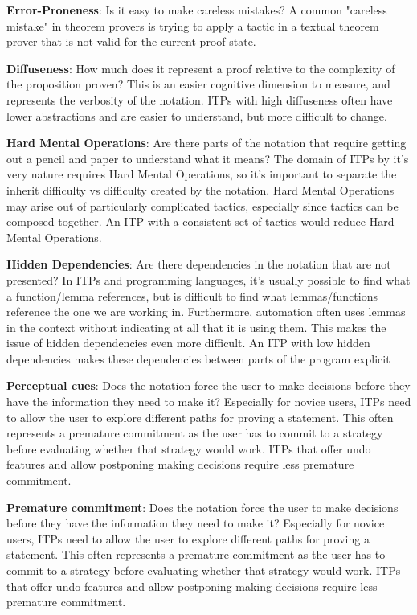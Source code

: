 \documentclass[
]{article}
\begin{document}
\textbf{Error-Proneness}: Is it easy to make careless mistakes? A common
"careless mistake" in theorem provers is trying to apply a tactic in a
textual theorem prover that is not valid for the current proof state.

\textbf{Diffuseness}: How much does it represent a proof relative to the
complexity of the proposition proven? This is an easier cognitive
dimension to measure, and represents the verbosity of the notation. ITPs
with high diffuseness often have lower abstractions and are easier to
understand, but more difficult to change.

\textbf{Hard Mental Operations}: Are there parts of the notation that
require getting out a pencil and paper to understand what it means? The
domain of ITPs by it's very nature requires Hard Mental Operations, so
it's important to separate the inherit difficulty vs difficulty created
by the notation. Hard Mental Operations may arise out of particularly
complicated tactics, especially since tactics can be composed together.
An ITP with a consistent set of tactics would reduce Hard Mental
Operations.

\textbf{Hidden Dependencies}: Are there dependencies in the notation
that are not presented? In ITPs and programming languages, it's usually
possible to find what a function/lemma references, but is difficult to
find what lemmas/functions reference the one we are working in.
Furthermore, automation often uses lemmas in the context without
indicating at all that it is using them. This makes the issue of hidden
dependencies even more difficult. An ITP with low hidden dependencies
makes these dependencies between parts of the program explicit

\textbf{Perceptual cues}: Does the notation force the user to make
decisions before they have the information they need to make it?
Especially for novice users, ITPs need to allow the user to explore
different paths for proving a statement. This often represents a
premature commitment as the user has to commit to a strategy before
evaluating whether that strategy would work. ITPs that offer undo
features and allow postponing making decisions require less premature
commitment.

\textbf{Premature commitment}: Does the notation force the user to make
decisions before they have the information they need to make it?
Especially for novice users, ITPs need to allow the user to explore
different paths for proving a statement. This often represents a
premature commitment as the user has to commit to a strategy before
evaluating whether that strategy would work. ITPs that offer undo
features and allow postponing making decisions require less premature
commitment.
\end{document}
